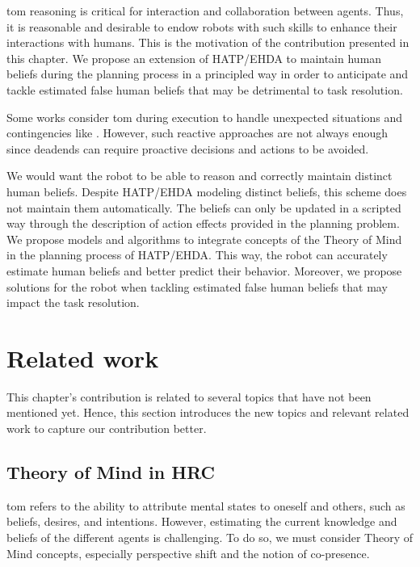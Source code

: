 \acrfull{tom} reasoning is critical for interaction and collaboration between agents. Thus, it is reasonable and desirable to endow robots with such skills to enhance their interactions with humans. This is the motivation of the contribution presented in this chapter. We propose an extension of HATP/EHDA to maintain human beliefs during the planning process in a principled way in order to anticipate and tackle estimated false human beliefs that may be detrimental to task resolution.

Some works consider \acrshort{tom} during execution to handle unexpected situations and contingencies like \cite{devin_implemented_2016}. 
However, such reactive approaches are not always enough since deadends can require proactive decisions and actions to be avoided. 

We would want the robot to be able to reason and correctly maintain distinct human beliefs. Despite HATP/EHDA modeling distinct beliefs, this scheme does not maintain them automatically. The beliefs can only be updated in a scripted way through the description of action effects provided in the planning problem. We propose models and algorithms to integrate concepts of the Theory of Mind in the planning process of HATP/EHDA. This way, the robot can accurately estimate human beliefs and better predict their behavior. Moreover, we propose solutions for the robot when tackling estimated false human beliefs that may impact the task resolution.


\section{Related work}

    This chapter's contribution is related to several topics that have not been mentioned yet. Hence, this section introduces the new topics and relevant related work to capture our contribution better.  

    \subsection{Theory of Mind in HRC}
    \acrfull{tom} refers to the ability to attribute mental states to oneself and others, such as beliefs, desires, and intentions. However, estimating the current knowledge and beliefs of the different agents is challenging. To do so, we must consider Theory of Mind concepts, especially perspective shift and the notion of co-presence.
    
